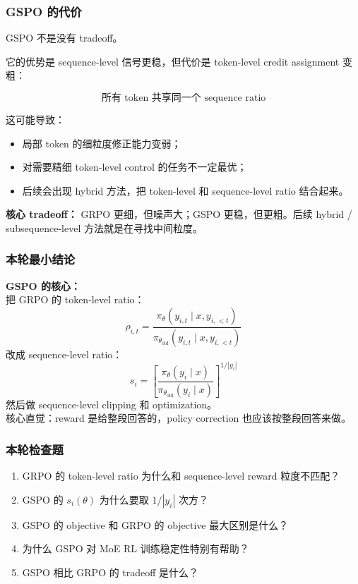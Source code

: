 \subsubsection{GSPO 的代价}

GSPO 不是没有 tradeoff。

它的优势是 sequence-level 信号更稳，但代价是 token-level credit assignment 变粗：

\[
\text{所有 token 共享同一个 sequence ratio}
\]

这可能导致：

\begin{itemize}[leftmargin=1.5em]
  \item 局部 token 的细粒度修正能力变弱；
  \item 对需要精细 token-level control 的任务不一定最优；
  \item 后续会出现 hybrid 方法，把 token-level 和 sequence-level ratio 结合起来。
\end{itemize}

\begin{warnbox}
\textbf{核心 tradeoff：} GRPO 更细，但噪声大；GSPO 更稳，但更粗。后续 hybrid / subsequence-level 方法就是在寻找中间粒度。
\end{warnbox}

\subsubsection{本轮最小结论}

\begin{summarybox}
\textbf{GSPO 的核心：}\\
把 GRPO 的 token-level ratio：
\[
\rho_{i,t}
=
\frac{\pi_\theta(y_{i,t}\mid x,y_{i,<t})}
{\pi_{\theta_\text{old}}(y_{i,t}\mid x,y_{i,<t})}
\]
改成 sequence-level ratio：
\[
s_i
=
\left[
\frac{\pi_\theta(y_i\mid x)}
{\pi_{\theta_\text{old}}(y_i\mid x)}
\right]^{1/|y_i|}
\]
然后做 sequence-level clipping 和 optimization。\\
核心直觉：reward 是给整段回答的，policy correction 也应该按整段回答来做。
\end{summarybox}

\subsubsection{本轮检查题}

\begin{enumerate}[leftmargin=1.5em]
  \item GRPO 的 token-level ratio 为什么和 sequence-level reward 粒度不匹配？
  \item GSPO 的 $s_i(\theta)$ 为什么要取 $1/|y_i|$ 次方？
  \item GSPO 的 objective 和 GRPO 的 objective 最大区别是什么？
  \item 为什么 GSPO 对 MoE RL 训练稳定性特别有帮助？
  \item GSPO 相比 GRPO 的 tradeoff 是什么？
\end{enumerate}
